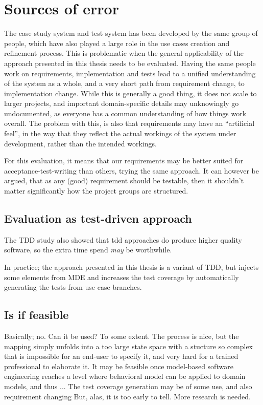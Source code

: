 \section{Sources of error}
The case study system and test system has been developed by the same group of people, which have also played a large role in the use cases creation and refinement process. This is problematic when the general applicability of the approach presented in this thesis needs to be evaluated. Having the same people work on requirements, implementation and tests lead to a unified understanding of the system as a whole, and a very short path from requirement change, to implementation change. While this is generally a good thing, it does not scale to larger projects, and important domain-specific details may unknowingly go undocumented, as everyone has a common understanding of how things work overall. The problem with this, is also that requirements may have an ``artificial feel'', in the way that they reflect the actual workings of the system under development, rather than the intended workings.\medskip

\noindent For this evaluation, it means that our requirements may be better suited for acceptance-test-writing than others, trying the same approach. It can however be argued, that as any (good) requirement should be testable\cite{hull2010requirements}, then it shouldn't matter significantly how the project groups are structured.

\subsection{Evaluation as test-driven approach}
The TDD study also showed that tdd approaches do produce higher quality software, so the extra time spend \emph{may} be worthwhile.

In practice; the approach presented in this thesis is a variant of TDD, but injects some elements from MDE and increases the test coverage by automatically generating the tests from use case branches.



\subsection{Is if feasible}
Basically; no. Can it be used? To some extent. The process is nice, but the mapping simply unfolds into a too large state space with a stucture so complex that is impossible for an end-user to specify it, and very hard for a trained professional to elaborate it. It may be feasible once model-based software engineering reaches a level where behavioral model can be applied to domain models, and thus ...
The test coverage generation may be of some use, and also requirement changing
But, alas, it is too early to tell. More research is needed.


